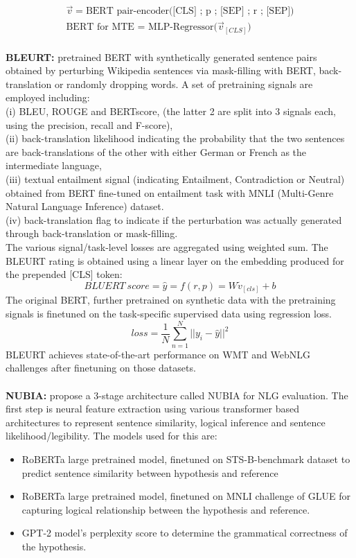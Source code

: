 \begin{gather*}
    \overrightarrow{v} = \text{BERT pair-encoder([CLS] ; p ; [SEP] ; r ; [SEP])}
    \\
    \text{BERT for MTE = MLP-Regressor}\big(\overrightarrow{v}_{[CLS]} \big)
\end{gather*}
\\
\textbf{BLEURT: }  pretrained BERT with synthetically generated sentence pairs obtained by perturbing Wikipedia sentences via mask-filling with BERT, back-translation or randomly dropping words. A set of pretraining signals are employed including:\\
(i) BLEU, ROUGE and BERTscore, (the latter 2 are split into 3 signals each, using the precision, recall and F-score),\\
(ii) back-translation likelihood indicating the probability that the two sentences are back-translations of the other with either German or French as the intermediate language,\\
(iii) textual entailment signal (indicating Entailment, Contradiction or Neutral) obtained from BERT fine-tuned on entailment task with MNLI (Multi-Genre Natural Language Inference) dataset.\\
(iv) back-translation flag to indicate if the perturbation was actually generated through back-translation or mask-filling.\\
The various signal/task-level losses are aggregated using weighted sum. The BLEURT rating is obtained using a linear layer on the embedding produced for the prepended [CLS] token:
$$ BLUERT\ score = \hat{y} = f(r,p) = W\tilde{v}_{[cls]}+b $$
The original BERT, further pretrained on synthetic data with the pretraining signals is finetuned on the task-specific supervised data using regression loss.
$$ loss= \frac{1}{N}\sum_{n=1}^N||y_i-\hat{y}||^2$$
BLEURT achieves state-of-the-art performance on WMT and WebNLG challenges after finetuning on those datasets.\\
\\
\textbf{NUBIA:}  propose a 3-stage architecture called NUBIA for NLG evaluation. The first step is neural feature extraction using various transformer based architectures to represent sentence similarity, logical inference and sentence likelihood/legibility.
The models used for this are:
\begin{itemize}
    \item RoBERTa large pretrained model, finetuned on STS-B-benchmark dataset to predict sentence similarity between hypothesis and reference 
    \item RoBERTa large pretrained model, finetuned on MNLI challenge of GLUE for capturing logical relationship between the hypothesis and reference.
    \item GPT-2 model's perplexity score to determine the grammatical correctness of the hypothesis.
\end{itemize}
